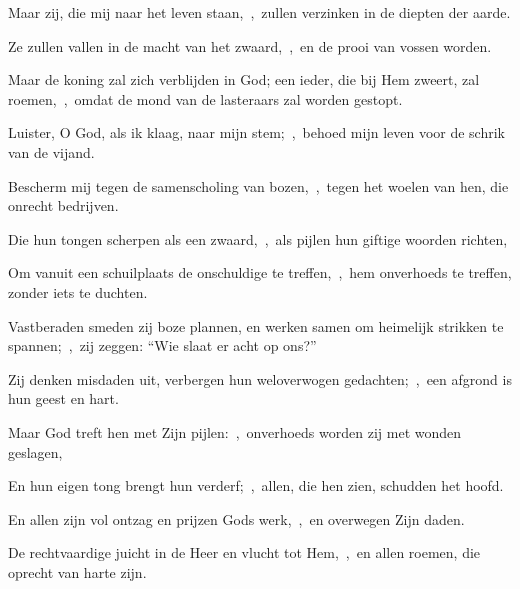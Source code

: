 \documentclass[12pt,twoside,a5paper]{article}
\begin{document}
\begin{halfparskip}
  Maar zij, die mij naar het leven staan,~\sep\ zullen verzinken in de diepten der aarde.

  Ze zullen vallen in de macht van het zwaard,~\sep\ en de prooi van vossen worden.

  Maar de koning zal zich verblijden in God; een ieder, die bij Hem zweert, zal roemen,~\sep\ omdat de mond van de lasteraars zal worden gestopt.
\end{halfparskip}



\begin{halfparskip}
  Luister, O God, als ik klaag, naar mijn stem;~\sep\ behoed mijn leven voor de schrik van de vijand.


  Bescherm mij tegen de samenscholing van bozen,~\sep\ tegen het woelen van hen, die onrecht bedrijven.

  Die hun tongen scherpen als een zwaard,~\sep\ als pijlen hun giftige woorden richten,

  Om vanuit een schuilplaats de onschuldige te treffen,~\sep\ hem onverhoeds te treffen, zonder iets te duchten.

  Vastberaden smeden zij boze plannen, en werken samen om heimelijk strikken te spannen;~\sep\ zij zeggen: ``Wie slaat er acht op ons?''

  Zij denken misdaden uit, verbergen hun weloverwogen gedachten;~\sep\ een afgrond is hun geest en hart.
\end{halfparskip}


\begin{halfparskip}
  Maar God treft hen met Zijn pijlen:~\sep\ onverhoeds worden zij met wonden geslagen,

  En hun eigen tong brengt hun verderf;~\sep\ allen, die hen zien, schudden het hoofd.

  En allen zijn vol ontzag en prijzen Gods werk,~\sep\ en overwegen Zijn daden.

  De rechtvaardige juicht in de Heer en vlucht tot Hem,~\sep\ en allen roemen, die oprecht van harte zijn.
\end{halfparskip}

\end{document}
